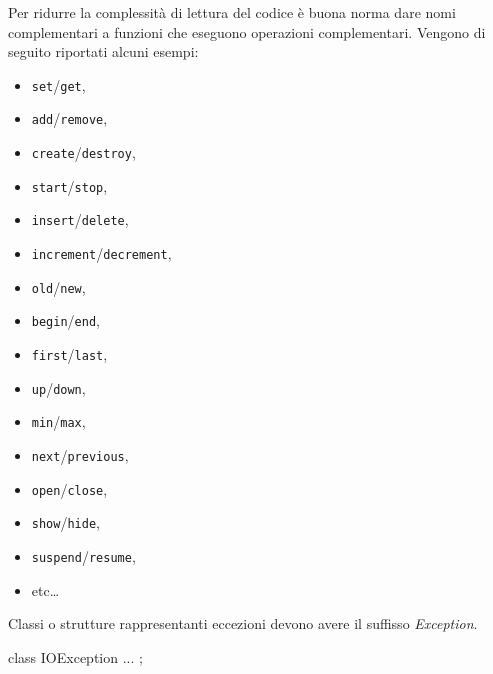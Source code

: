 Per ridurre la complessità di lettura del codice è buona norma dare nomi complementari a funzioni che eseguono operazioni complementari.
Vengono di seguito riportati alcuni esempi:
\begin{itemize}
	\item \texttt{set}/\texttt{get},
	\item \texttt{add}/\texttt{remove},
	\item \texttt{create}/\texttt{destroy}, 
	\item \texttt{start}/\texttt{stop},
	\item \texttt{insert}/\texttt{delete},
	\item \texttt{increment}/\texttt{decrement},
	\item \texttt{old}/\texttt{new},
	\item \texttt{begin}/\texttt{end},
	\item \texttt{first}/\texttt{last},
	\item \texttt{up}/\texttt{down},
	\item \texttt{min}/\texttt{max},
	\item \texttt{next}/\texttt{previous},
	\item \texttt{open}/\texttt{close},
	\item \texttt{show}/\texttt{hide},
	\item \texttt{suspend}/\texttt{resume},
	\item etc\dots
\end{itemize}

Classi o strutture rappresentanti eccezioni devono avere il suffisso \emph{Exception}.

\begin{minipage}[t]{\rbwidth}
\begin{RightCode}
class IOException
{
	...
};
\end{RightCode}
\end{minipage}%

